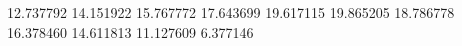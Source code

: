 12.737792
14.151922
15.767772
17.643699
19.617115
19.865205
18.786778
16.378460
14.611813
11.127609
6.377146
